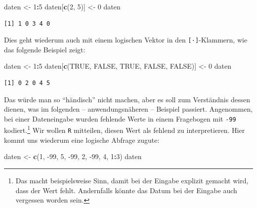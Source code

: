 \documentclass[12pt,]{tufte-book}
\newenvironment{Shaded}{\begin{snugshade}}{\end{snugshade}}
\newcommand{\KeywordTok}[1]{\textcolor[rgb]{0.13,0.29,0.53}{\textbf{#1}}}
\newcommand{\DecValTok}[1]{\textcolor[rgb]{0.00,0.00,0.81}{#1}}
\newcommand{\StringTok}[1]{\textcolor[rgb]{0.31,0.60,0.02}{#1}}
\newcommand{\OtherTok}[1]{\textcolor[rgb]{0.56,0.35,0.01}{#1}}
\newcommand{\OperatorTok}[1]{\textcolor[rgb]{0.81,0.36,0.00}{\textbf{#1}}}
\newcommand{\NormalTok}[1]{#1}
\theoremstyle{definition}
\theoremstyle{definition}
\theoremstyle{definition}
\theoremstyle{remark}
\begin{document}
\begin{Shaded}
\begin{Highlighting}[]
\NormalTok{daten <-}\StringTok{ }\DecValTok{1}\OperatorTok{:}\DecValTok{5}
\NormalTok{daten[}\KeywordTok{c}\NormalTok{(}\DecValTok{2}\NormalTok{, }\DecValTok{5}\NormalTok{)] <-}\StringTok{ }\DecValTok{0}
\NormalTok{daten}
\end{Highlighting}
\end{Shaded}

\begin{verbatim}
[1] 1 0 3 4 0
\end{verbatim}

Dies geht wiederum auch mit einem logischen Vektor in den
\texttt{{[}·{]}}-Klammern, wie das folgende Beispiel zeigt:

\begin{Shaded}
\begin{Highlighting}[]
\NormalTok{daten <-}\StringTok{ }\DecValTok{1}\OperatorTok{:}\DecValTok{5}
\NormalTok{daten[}\KeywordTok{c}\NormalTok{(}\OtherTok{TRUE}\NormalTok{, }\OtherTok{FALSE}\NormalTok{, }\OtherTok{TRUE}\NormalTok{, }\OtherTok{FALSE}\NormalTok{, }\OtherTok{FALSE}\NormalTok{)] <-}\StringTok{ }\DecValTok{0}
\NormalTok{daten}
\end{Highlighting}
\end{Shaded}

\begin{verbatim}
[1] 0 2 0 4 5
\end{verbatim}

Das würde man so ``händisch'' nicht machen, aber es soll zum Verständnis
dessen dienen, was im folgenden -- anwendungsnäheren -- Beispiel
passiert. Angenommen, bei einer Dateneingabe wurden fehlende Werte in
einem Fragebogen mit \texttt{-99} kodiert.\footnote{Das macht
  beispielsweise Sinn, damit bei der Eingabe explizit gemacht wird, dass
  der Wert fehlt. Andernfalls könnte das Datum bei der Eingabe auch
  vergessen worden sein.} Wir wollen \texttt{R} mitteilen, diesen Wert
als fehlend zu interpretieren. Hier kommt uns wiederum eine logische
Abfrage zugute:

\begin{Shaded}
\begin{Highlighting}[]
\NormalTok{daten <-}\StringTok{ }\KeywordTok{c}\NormalTok{(}\DecValTok{1}\NormalTok{, }\DecValTok{-99}\NormalTok{, }\DecValTok{5}\NormalTok{, }\DecValTok{-99}\NormalTok{, }\DecValTok{2}\NormalTok{, }\DecValTok{-99}\NormalTok{, }\DecValTok{4}\NormalTok{, }\DecValTok{1}\OperatorTok{:}\DecValTok{3}\NormalTok{)}
\NormalTok{daten}
\end{Highlighting}
\end{Shaded}
\end{document}
